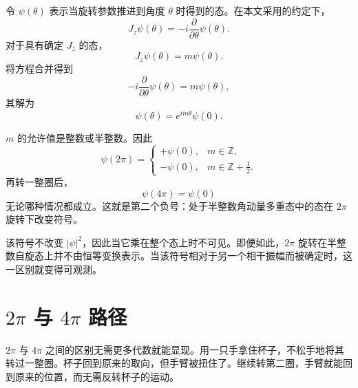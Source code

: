 \begin{classroomqa}
\end{classroomqa}


令 \(\psi(\theta)\) 表示当旋转参数推进到角度 \(\theta\) 时得到的态。在本文采用的约定下，
\begin{equation}
J_z\psi(\theta)
=
-i\frac{\partial}{\partial\theta}\psi(\theta).
\end{equation}
对于具有确定 \(J_z\) 的态，
\begin{equation}
J_z\psi(\theta)=m\psi(\theta).
\end{equation}
将方程合并得到
\begin{equation}
-i\frac{\partial}{\partial\theta}\psi(\theta)
=
m\psi(\theta),
\end{equation}
其解为
\begin{equation}
\psi(\theta)=e^{im\theta}\psi(0).
\end{equation}

\(m\) 的允许值是整数或半整数。因此
\begin{equation}
\psi(2\pi)
=
\begin{cases}
+\psi(0), & m\in\mathbb Z,\\[4pt]
-\psi(0), & m\in\mathbb Z+\tfrac12.
\end{cases}
\end{equation}
再转一整圈后，
\begin{equation}
\psi(4\pi)=\psi(0)
\end{equation}
无论哪种情况都成立。这就是第二个负号：处于半整数角动量多重态中的态在 \(2\pi\) 旋转下改变符号。

该符号不改变 \(\lvert\psi\rvert^2\)，因此当它乘在整个态上时不可见。即便如此，\(2\pi\) 旋转在半整数自旋态上并不由恒等变换表示。当该符号相对于另一个相干振幅而被确定时，这一区别就变得可观测。

\section{\texorpdfstring{\(2\pi\) 与 \(4\pi\)}{2 pi 和 4 pi} 路径}

\(2\pi\) 与 \(4\pi\) 之间的区别无需更多代数就能显现。用一只手拿住杯子，不松手地将其转过一整圈。杯子回到原来的取向，但手臂被扭住了。继续转第二圈，手臂就能回到原来的位置，而无需反转杯子的运动。

